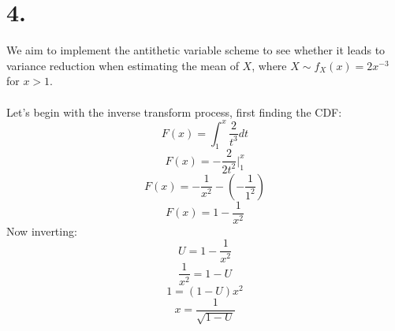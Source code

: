 \documentclass{article}
\begin{document}
{\Large 

\section*{4.}

We aim to implement the antithetic variable scheme to see whether it leads to variance reduction when estimating the mean of \(X\), where \(X \sim f_X(x) = 2x^{-3}\) for \(x > 1\). \\ \\
Let's begin with the inverse transform process, first finding the CDF:
\[
  F(x) = \int_1^x \frac{2}{t^3} dt 
\]
\[
  F(x) = -\frac{2}{2t^2} |_1^x 
\]
\[
  F(x) = -\frac{1}{x^2} - (-\frac{1}{1^2})
\]
\[
  F(x) =  1 - \frac{1}{x^2} 
\]
Now inverting:
\[
  U = 1 - \frac{1}{x^2}
\]
\[
  \frac{1}{x^2} = 1 - U
\]
\[
  1 = (1 - U)x^2
\]
\[
  x = \frac{1}{\sqrt{1 - U}}
\]

}
\end{document}
